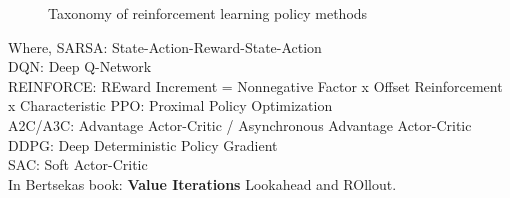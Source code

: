 \documentclass[12pt,english]{report}
\begin{document}
\begin{figure}[H]
    \centering
    \caption{Taxonomy of reinforcement learning policy methods}
    \label{fig:rl-policy-tree}
\end{figure}
Where, 
SARSA: State-Action-Reward-State-Action\\
DQN: Deep Q-Network\\
REINFORCE: REward Increment = Nonnegative Factor x Offset Reinforcement x Characteristic
PPO: Proximal Policy Optimization\\
A2C/A3C: Advantage Actor-Critic / Asynchronous Advantage Actor-Critic\\
DDPG: Deep Deterministic Policy Gradient\\
SAC: Soft Actor-Critic\\
In Bertsekas book: \textbf{Value Iterations} Lookahead and ROllout.
 
\end{document}
